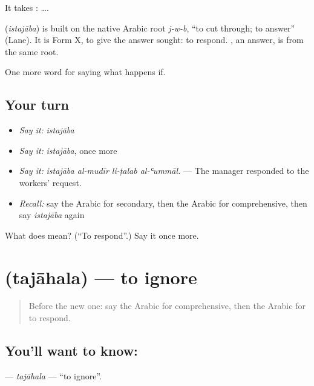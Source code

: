 It takes :   ….

\begin{cousinweb}
\textbf{} (\emph{istajāba}) is built on the native Arabic root \emph{j-w-b}, \textquotedblleft{}to cut through; to answer\textquotedblright{} (Lane). It is Form X, to give the answer sought: to respond. , an answer, is from the same root.
\end{cousinweb}

\begin{grammarlens}[title={What you've built}]
One more word for saying what happens if.
\end{grammarlens}

\subsection*{Your turn}
\begin{itemize}
\raggedright
  \item \emph{Say it:} \emph{istajāba}
  \item \emph{Say it:} \emph{istajāba}, once more
  \item \emph{Say it:} \emph{istajāba al-mudīr li-ṭalab al-ʿummāl.} — The manager responded to the workers' request.
  \item \emph{Recall:} say the Arabic for secondary, then the Arabic for comprehensive, then say \emph{istajāba} again
\end{itemize}

\begin{tcolorbox}[breakable,colback=teal!4,colframe=teal!35!black,title={Before you move on}]
What does  mean? (\textquotedblleft{}To respond\textquotedblright{}.) Say it once more.
\end{tcolorbox}
\section[\texorpdfstring{\ar{تجاهل} (tajāhala)}{تجاهل (tajāhala)}]{ (tajāhala) — to ignore}

\label{lesson:AR-C420-tajahala}



\begin{quote}
Before the new one: say the Arabic for comprehensive, then the Arabic for to respond.
\end{quote}

\subsection*{You'll want to know: }
\textbf{} — \emph{tajāhala} — \textquotedblleft{}to ignore\textquotedblright{}.


